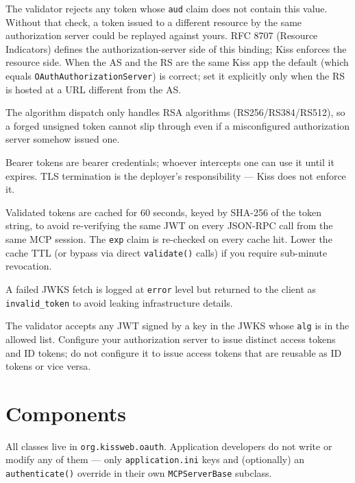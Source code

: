 \begin{description}[style=nextline]
  \item[Make sure \texttt{OAuthResourceIdentifier} reflects this resource server's URL.]  The validator rejects any token whose \texttt{aud} claim does not contain this value.  Without that check, a token issued to a different resource by the same authorization server could be replayed against yours.  RFC 8707 (Resource Indicators) defines the authorization-server side of this binding; Kiss enforces the resource side.  When the AS and the RS are the same Kiss app the default (which equals \texttt{OAuthAuthorizationServer}) is correct; set it explicitly only when the RS is hosted at a URL different from the AS.
  \item[\texttt{alg=none} is always rejected.]  The algorithm dispatch only handles RSA algorithms (RS256/RS384/RS512), so a forged unsigned token cannot slip through even if a misconfigured authorization server somehow issued one.
  \item[Run over HTTPS.]  Bearer tokens are bearer credentials; whoever intercepts one can use it until it expires.  TLS termination is the deployer's responsibility --- Kiss does not enforce it.
  \item[Brief validation cache.]  Validated tokens are cached for 60 seconds, keyed by SHA-256 of the token string, to avoid re-verifying the same JWT on every JSON-RPC call from the same MCP session.  The \texttt{exp} claim is re-checked on every cache hit.  Lower the cache TTL (or bypass via direct \texttt{validate()} calls) if you require sub-minute revocation.
  \item[JWKS fetch failures surface as 401, not 5xx.]  A failed JWKS fetch is logged at \texttt{error} level but returned to the client as \texttt{invalid\_token} to avoid leaking infrastructure details.
  \item[No token-type check.]  The validator accepts any JWT signed by a key in the JWKS whose \texttt{alg} is in the allowed list.  Configure your authorization server to issue distinct access tokens and ID tokens; do not configure it to issue access tokens that are reusable as ID tokens or vice versa.
\end{description}

\section{Components}
\label{sec:oauth-components}

All classes live in \texttt{org.kiss\-web.oauth}.  Application developers do not write or modify any of them --- only \texttt{appli\-cation.ini} keys and (optionally) an \texttt{authenticate()} override in their own \texttt{MCPServer\-Base} subclass.

